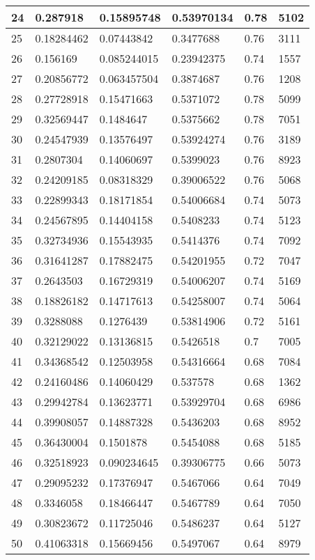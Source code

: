 \begin{longtable}{|l|l|l|l|l|l|}
24 & 0.287918 & 0.15895748 & 0.53970134 & 0.78 & 5102 \\ \hline 
25 & 0.18284462 & 0.07443842 & 0.3477688 & 0.76 & 3111 \\ \hline 
26 & 0.156169 & 0.085244015 & 0.23942375 & 0.74 & 1557 \\ \hline 
27 & 0.20856772 & 0.063457504 & 0.3874687 & 0.76 & 1208 \\ \hline 
28 & 0.27728918 & 0.15471663 & 0.5371072 & 0.78 & 5099 \\ \hline 
29 & 0.32569447 & 0.1484647 & 0.5375662 & 0.78 & 7051 \\ \hline 
30 & 0.24547939 & 0.13576497 & 0.53924274 & 0.76 & 3189 \\ \hline 
31 & 0.2807304 & 0.14060697 & 0.5399023 & 0.76 & 8923 \\ \hline 
32 & 0.24209185 & 0.08318329 & 0.39006522 & 0.76 & 5068 \\ \hline 
33 & 0.22899343 & 0.18171854 & 0.54006684 & 0.74 & 5073 \\ \hline 
34 & 0.24567895 & 0.14404158 & 0.5408233 & 0.74 & 5123 \\ \hline 
35 & 0.32734936 & 0.15543935 & 0.5414376 & 0.74 & 7092 \\ \hline 
36 & 0.31641287 & 0.17882475 & 0.54201955 & 0.72 & 7047 \\ \hline 
37 & 0.2643503 & 0.16729319 & 0.54006207 & 0.74 & 5169 \\ \hline 
38 & 0.18826182 & 0.14717613 & 0.54258007 & 0.74 & 5064 \\ \hline 
39 & 0.3288088 & 0.1276439 & 0.53814906 & 0.72 & 5161 \\ \hline 
40 & 0.32129022 & 0.13136815 & 0.5426518 & 0.7 & 7005 \\ \hline 
41 & 0.34368542 & 0.12503958 & 0.54316664 & 0.68 & 7084 \\ \hline 
42 & 0.24160486 & 0.14060429 & 0.537578 & 0.68 & 1362 \\ \hline 
43 & 0.29942784 & 0.13623771 & 0.53929704 & 0.68 & 6986 \\ \hline 
44 & 0.39908057 & 0.14887328 & 0.5436203 & 0.68 & 8952 \\ \hline 
45 & 0.36430004 & 0.1501878 & 0.5454088 & 0.68 & 5185 \\ \hline 
46 & 0.32518923 & 0.090234645 & 0.39306775 & 0.66 & 5073 \\ \hline 
47 & 0.29095232 & 0.17376947 & 0.5467066 & 0.64 & 7049 \\ \hline 
48 & 0.3346058 & 0.18466447 & 0.5467789 & 0.64 & 7050 \\ \hline 
49 & 0.30823672 & 0.11725046 & 0.5486237 & 0.64 & 5127 \\ \hline 
50 & 0.41063318 & 0.15669456 & 0.5497067 & 0.64 & 8979 \\ \hline 
\end{longtable}